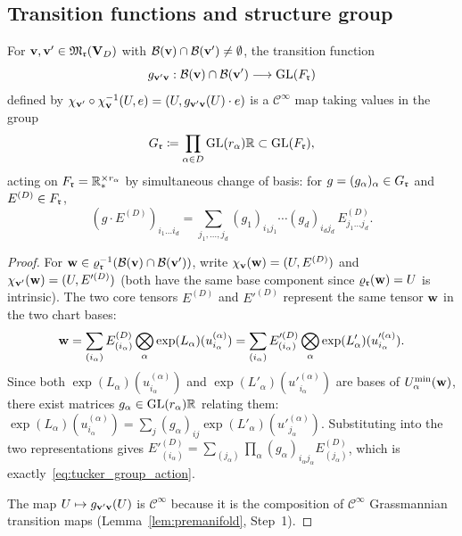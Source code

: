 \subsection*{Transition functions and structure group}

\begin{proposition}
\label{prop:tucker_transition_fns}
For $\mathbf{v}, \mathbf{v}' \in \mathfrak{M}_{\mathfrak{r}}(\mathbf{V}_D)$ with
$\mathcal{B}(\mathbf{v}) \cap \mathcal{B}(\mathbf{v}') \neq \emptyset$, the
transition function
\begin{equation}
\label{eq:tucker_transition_fn}
    g_{\mathbf{v}'\mathbf{v}} :
    \mathcal{B}(\mathbf{v}) \cap \mathcal{B}(\mathbf{v}')
    \longrightarrow \mathrm{GL}(F_{\mathfrak{r}})
\end{equation}
defined by $\chi_{\mathbf{v}'} \circ \chi_{\mathbf{v}}^{-1}(U, e)
= (U, g_{\mathbf{v}'\mathbf{v}}(U) \cdot e)$
is a $\mathcal{C}^\infty$ map taking values in the group
\begin{equation}
\label{eq:tucker_structure_group}
    G_{\mathfrak{r}} \coloneqq
    \prod_{\alpha \in D} \mathrm{GL}(r_\alpha){\mathbb{R}}
    \subset \mathrm{GL}(F_{\mathfrak{r}}),
\end{equation}
acting on $F_{\mathfrak{r}} = \mathbb{R}^{\times r_\alpha}_*$ by simultaneous change
of basis: for $g = (g_\alpha)_\alpha \in G_{\mathfrak{r}}$ and
$E^{(D)} \in F_{\mathfrak{r}}$,
\begin{equation}
\label{eq:tucker_group_action}
    (g \cdot E^{(D)})_{i_1 \ldots i_d}
    = \sum_{j_1, \ldots, j_d}
      (g_1)_{i_1 j_1} \cdots (g_d)_{i_d j_d}\,
      E^{(D)}_{j_1 \ldots j_d}.
\end{equation}
\end{proposition}

\begin{proof}
For $\mathbf{w} \in \varrho_{\mathfrak{r}}^{-1}(\mathcal{B}(\mathbf{v}) \cap \mathcal{B}(\mathbf{v}'))$,
write $\chi_{\mathbf{v}}(\mathbf{w}) = (U, E^{(D)})$ and $\chi_{\mathbf{v}'}(\mathbf{w}) =
(U, E'^{(D)})$ (both have the same base component since $\varrho_{\mathfrak{r}}(\mathbf{w})
= U$ is intrinsic). The two core tensors $E^{(D)}$ and $E'^{(D)}$
represent the same tensor $\mathbf{w}$ in the two chart bases:
\begin{equation*}
    \mathbf{w}
    = \sum_{(i_\alpha)} E^{(D)}_{(i_\alpha)}
      \bigotimes_\alpha \exp(L_\alpha)(u^{(\alpha)}_{i_\alpha})
    = \sum_{(i_\alpha)} E'^{(D)}_{(i_\alpha)}
      \bigotimes_\alpha \exp(L'_\alpha)(u'^{(\alpha)}_{i_\alpha}).
\end{equation*}
Since both $\exp(L_\alpha)(u^{(\alpha)}_{i_\alpha})$ and
$\exp(L'_\alpha)(u'^{(\alpha)}_{i_\alpha})$ are bases of
$U^{\min}_{\alpha}(\mathbf{w})$, there exist matrices $g_\alpha \in \mathrm{GL}(r_\alpha){\mathbb{R}}$
relating them:
$\exp(L_\alpha)(u^{(\alpha)}_{i_\alpha})
= \sum_j (g_\alpha)_{ij}
\exp(L'_\alpha)(u'^{(\alpha)}_{j_\alpha})$.
Substituting into the two representations gives
$E'^{(D)}_{(i_\alpha)} = \sum_{(j_\alpha)} \prod_\alpha (g_\alpha)_{i_\alpha j_\alpha}
E^{(D)}_{(j_\alpha)}$, which is exactly~\eqref{eq:tucker_group_action}.

The map $U \mapsto g_{\mathbf{v}'\mathbf{v}}(U)$ is $\mathcal{C}^\infty$ because
it is the composition of $\mathcal{C}^\infty$ Grassmannian transition
maps (Lemma~\ref{lem:premanifold}, Step~1).
\end{proof}

